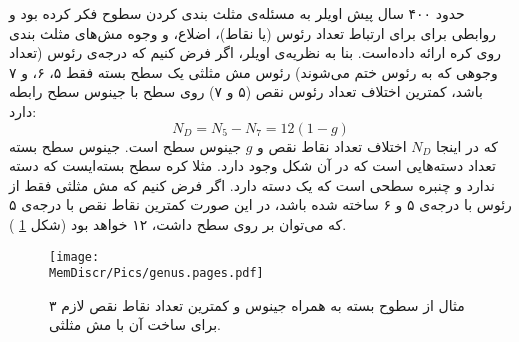 
حدود ۴۰۰ سال پیش اویلر به مسئله‌ی مثلث بندی کردن سطوح فکر کرده بود و روابطی برای برای ارتباط تعداد رئوس (یا نقاط)، اضلاع، و وجوه مش‌های مثلث بندی روی کره ارائه داده‌است.  بنا به نظریه‌ی اویلر، اگر فرض کنیم که درجه‌ی رئوس (تعداد وجوهی که به رئوس ختم می‌شوند) رئوس مش مثلثی یک سطح بسته فقط ۵، ۶، و ۷ باشد، کمترین اختلاف تعداد رئوس نقص (۵ و ۷) روی سطح با جینوس سطح رابطه دارد:
\begin{equation}
N_D=N_5-N_7=12(1-g)
\label{eq:genus}
\end{equation}
که در اینجا
$N_D$
اختلاف تعداد نقاط نقص و 
$g$
جینوس
 سطح است. جینوس سطح بسته تعداد دسته‌هایی است که در آن شکل وجود دارد. مثلا کره سطح بسته‌ایست که دسته ندارد و چنبره سطحی است که یک دسته دارد. اگر فرض کنیم که مش مثلثی‌ فقط از رئوس با درجه‌ی ۵ و ۶ ساخته شده باشد، در این صورت کمترین نقاط نقص با درجه‌ی ۵ که می‌توان بر روی سطح داشت، ۱۲ خواهد بود (شکل
 \ref{fig:genus}
 ).
\begin{figure}[h]
\begin{center}
\texttt{[image: \\MemDiscr/Pics/genus.pages.pdf]}
\caption{
۳ مثال از سطوح بسته به همراه جینوس و کمترین تعداد نقاط نقص لازم  برای ساخت آن با مش مثلثی.
}
\label{fig:genus}
\end{center}
\end{figure}


